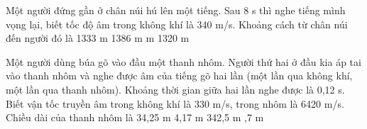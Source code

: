 \begin{ex}%
Một người đứng gần ở chân núi hú lên một tiếng. Sau 8 s thì nghe tiếng mình vọng lại, biết tốc độ âm trong không khí là 340 m/s. Khoảng cách từ chân núi đến người đó là
\choice
{1333 m}
{1386 m}
{ m}
{1320 m}
\end{ex} 


\begin{ex}%
Một người dùng búa gõ vào đầu một thanh nhôm. Người thứ hai ở đầu kia áp tai vào thanh nhôm và nghe được âm của tiếng gõ hai lần (một lần qua không khí, một lần qua thanh nhôm). Khoảng thời gian giữa hai lần nghe được là 0,12 s. Biết vận tốc truyền âm trong không khí là 330 m/s, trong nhôm là 6420 m/s. Chiều dài của thanh nhôm là
\choice
{34,25 m}
{4,17 m}
{342,5 m}
{,7 m}
\end{ex} 






